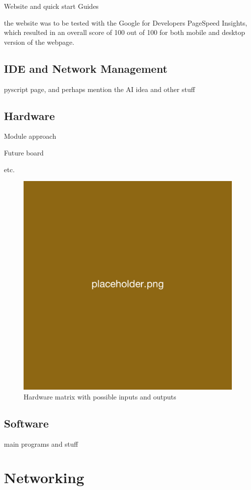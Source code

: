 Website and quick start Guides

the website was to be tested with the Google for Developers PageSpeed Insights, which resulted in an overall score of 100 out of 100 for both mobile and desktop version of the webpage.

\subsection{\label{sec:res_ide}IDE and Network Management}

pyscript page, and perhaps mention the AI idea and other stuff

\subsection{\label{sec:res_hardware}Hardware}

Module approach

Future board

etc.

\begin{figure}[H]
    \centering
    \includegraphics[width=0.5\linewidth]{overleaf/images/placeholder.png}
    \vspace{\ftspace}
    \caption{Hardware matrix with possible inputs and outputs}
    \label{fig:hardware}
\end{figure}

\subsection{\label{sec:res_software}Software}

main programs and stuff



\section{\label{sec:res_networking}Networking}%


